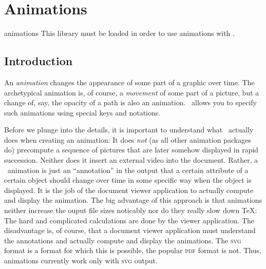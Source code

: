 %
%
%


\section{Animations}
\label{section-tikz-animations}


\begin{tikzlibrary}{animations}
  This library must be loaded in order to use animations with \tikzname.
\end{tikzlibrary}


\subsection{Introduction}

An \emph{animation} changes the appearance of some part of a graphic
over time. The archetypical animation is, of course, a \emph{movement} 
of some part of a picture, but a change of, say, the opacity of a path
is also an animation. \tikzname\ allows you to specify such animations
using special keys and notations.

\begin{codeexample}[width=8cm]
\end{codeexample}

Before we plunge into the details, it is important to understand what
\tikzname\ actually does when creating an animation: It does
\emph{not} (as all other animation packages do) precompute a sequence of
pictures that are later somehow displayed in rapid succession. Neither
does it insert an external video into the document. Rather, a
\tikzname\ animation is just an ``annotation'' in the output that a
certain attribute of a certain object should change over time in some
specific way when the object is displayed. It is the job of the
document viewer application to actually compute and display the
animation. The big advantage of this approach is that animations neither
increase the ouput file sizes noticably nor do they really slow down
\TeX: The hard and complicated calculations are done by the viewer
application. The disadvantage is, of course, that a document viewer
application must understand the annotations and actually compute and
display the animations. The \textsc{svg} format is a format for which
this is possible, the popular \textsc{pdf} format is not. Thus,
animations currently work only with \textsc{svg} output.

